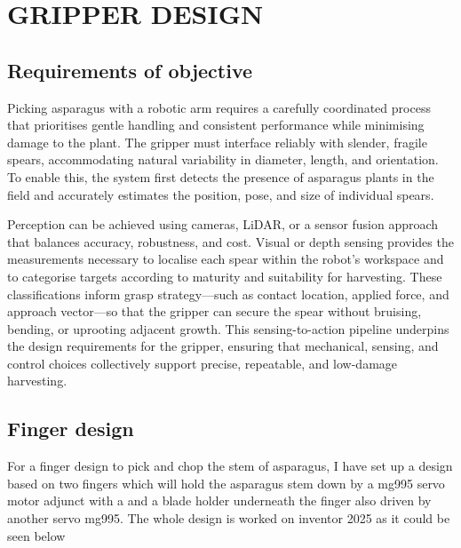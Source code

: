 \chapter{GRIPPER DESIGN}
\graphicspath{{./}{pictures/}{inventor/}}
\section{Requirements of objective}
Picking asparagus with a robotic arm requires a carefully coordinated process that prioritises gentle handling and consistent performance while minimising damage to the plant. The gripper must interface reliably with slender, fragile spears, accommodating natural variability in diameter, length, and orientation. To enable this, the system first detects the presence of asparagus plants in the field and accurately estimates the position, pose, and size of individual spears.

Perception can be achieved using cameras, LiDAR, or a sensor fusion approach that balances accuracy, robustness, and cost. Visual or depth sensing provides the measurements necessary to localise each spear within the robot’s workspace and to categorise targets according to maturity and suitability for harvesting. These classifications inform grasp strategy—such as contact location, applied force, and approach vector—so that the gripper can secure the spear without bruising, bending, or uprooting adjacent growth. This sensing-to-action pipeline underpins the design requirements for the gripper, ensuring that mechanical, sensing, and control choices collectively support precise, repeatable, and low-damage harvesting.




\section{Finger design}
For a finger design to pick and chop the stem of asparagus, I have set up a design based on
two fingers which will hold the asparagus stem down by a mg995 servo motor adjunct with a
and a blade holder underneath the finger also driven by another servo mg995. The whole
design is worked on inventor 2025 as it could be seen below


